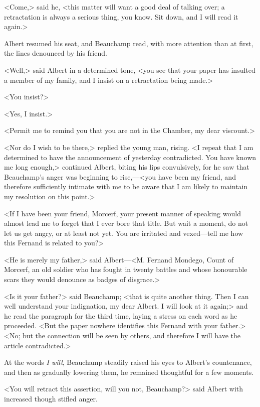 <Come,> said he, <this matter will want a good deal of talking over; a retractation is always a serious thing, you know. Sit down, and I will read it again.> 

 Albert resumed his seat, and Beauchamp read, with more attention than at first, the lines denounced by his friend. 

 <Well,> said Albert in a determined tone, <you see that your paper has insulted a member of my family, and I insist on a retractation being made.> 

 <You insist?> 

 <Yes, I insist.> 

 <Permit me to remind you that you are not in the Chamber, my dear viscount.> 

 <Nor do I wish to be there,> replied the young man, rising. <I repeat that I am determined to have the announcement of yesterday contradicted. You have known me long enough,> continued Albert, biting his lips convulsively, for he saw that Beauchamp's anger was beginning to rise,—<you have been my friend, and therefore sufficiently intimate with me to be aware that I am likely to maintain my resolution on this point.> 

 <If I have been your friend, Morcerf, your present manner of speaking would almost lead me to forget that I ever bore that title. But wait a moment, do not let us get angry, or at least not yet. You are irritated and vexed—tell me how this Fernand is related to you?> 

 <He is merely my father,> said Albert—<M. Fernand Mondego, Count of Morcerf, an old soldier who has fought in twenty battles and whose honourable scars they would denounce as badges of disgrace.> 

 <Is it your father?> said Beauchamp; <that is quite another thing. Then I can well understand your indignation, my dear Albert. I will look at it again;> and he read the paragraph for the third time, laying a stress on each word as he proceeded. <But the paper nowhere identifies this Fernand with your father.>  <No; but the connection will be seen by others, and therefore I will have the article contradicted.> 

 At the words \textit{I will}, Beauchamp steadily raised his eyes to Albert's countenance, and then as gradually lowering them, he remained thoughtful for a few moments. 

 <You will retract this assertion, will you not, Beauchamp?> said Albert with increased though stifled anger. 


